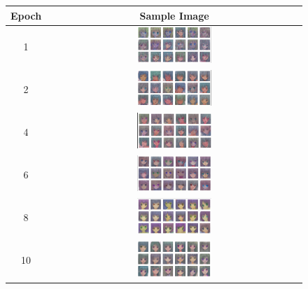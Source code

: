 \documentclass[twocolumn,superscriptaddress,aps]{revtex4-1}
\begin{document}
\begin{figure}[H]
    \centering
    \label{tab:mega_74m_samples}
    \begin{tabular}{c|c}
        \textbf{Epoch} & \textbf{Sample Image} \\
        \hline
        1 & \includegraphics[width=0.3\textwidth]{figures/Screenshot from 2025-08-06 09-38-10.png} \\
        2 & \includegraphics[width=0.3\textwidth]{figures/Screenshot from 2025-08-06 09-56-57.png} \\
        4 & \includegraphics[width=0.3\textwidth]{figures/Screenshot from 2025-08-06 12-27-54.png} \\
        6 & \includegraphics[width=0.3\textwidth]{figures/Screenshot from 2025-08-06 15-00-11.png} \\
        8 & \includegraphics[width=0.3\textwidth]{figures/Screenshot from 2025-08-06 17-12-05.png} \\
        10 & \includegraphics[width=0.3\textwidth]{figures/Screenshot from 2025-08-06 19-26-11.png} \\

\end{tabular}
\end{figure}
\end{document}
